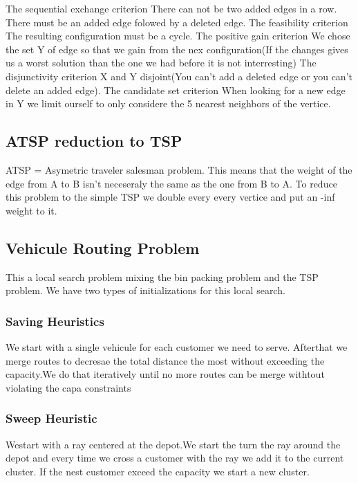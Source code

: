 The sequential exchange criterion\newline
There can not be two added edges in a row. There must be an added edge folowed by a deleted edge.
The feasibility criterion\newline
The resulting configuration must be a cycle.
The positive gain criterion\newline
We chose the set Y of edge so that we gain from the nex configuration(If the changes gives us a worst solution than the one we had before it is not interresting)
The disjunctivity criterion\newline
X and Y disjoint(You can't add a deleted edge or you can't delete an
added edge).
The candidate set criterion\newline
When looking for a new edge in Y we limit ourself to only considere the 5 nearest neighbors of the vertice.\newline

\subsection{ATSP reduction to TSP}
ATSP = Asymetric traveler salesman problem.
This means that the weight of the edge from A to B isn't neceseraly the same as the one from B to A. To reduce this problem to the simple TSP we double every every vertice and put an -inf weight to it.\newline

\subsection{Vehicule Routing Problem}
This a local search problem mixing the bin packing problem and the TSP problem.
We have two types of initializations for this local search.\newline
\subsubsection{Saving Heuristics}
We start with a single vehicule for each customer we need to serve.
Afterthat we merge routes to decresae the total distance the most without exceeding the capacity.We do that iteratively until no more routes can be merge withtout violating the capa constraints\newline

\subsubsection{Sweep Heuristic}
Westart with a ray centered at the depot.We start the turn the ray around the depot and every time we cross a customer with the ray we add it to the current cluster. If the nest customer exceed the capacity we start a new cluster.\newline

